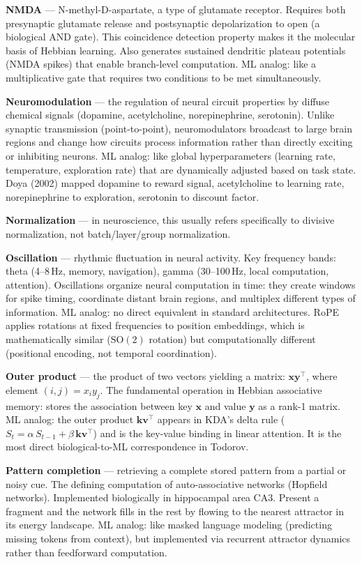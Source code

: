 \documentclass[11pt,a4paper]{article}
\begin{document}
\textbf{NMDA} --- N-methyl-D-aspartate, a type of glutamate receptor. Requires both presynaptic glutamate release and postsynaptic depolarization to open (a biological AND gate). This coincidence detection property makes it the molecular basis of Hebbian learning. Also generates sustained dendritic plateau potentials (NMDA spikes) that enable branch-level computation. ML analog: like a multiplicative gate that requires two conditions to be met simultaneously.

\textbf{Neuromodulation} --- the regulation of neural circuit properties by diffuse chemical signals (dopamine, acetylcholine, norepinephrine, serotonin). Unlike synaptic transmission (point-to-point), neuromodulators broadcast to large brain regions and change how circuits process information rather than directly exciting or inhibiting neurons. ML analog: like global hyperparameters (learning rate, temperature, exploration rate) that are dynamically adjusted based on task state. Doya (2002) mapped dopamine to reward signal, acetylcholine to learning rate, norepinephrine to exploration, serotonin to discount factor.

\textbf{Normalization} --- in neuroscience, this usually refers specifically to divisive normalization, not batch/layer/group normalization.

\textbf{Oscillation} --- rhythmic fluctuation in neural activity. Key frequency bands: theta (4--8\,Hz, memory, navigation), gamma (30--100\,Hz, local computation, attention). Oscillations organize neural computation in time: they create windows for spike timing, coordinate distant brain regions, and multiplex different types of information. ML analog: no direct equivalent in standard architectures. RoPE applies rotations at fixed frequencies to position embeddings, which is mathematically similar ($\mathrm{SO}(2)$ rotation) but computationally different (positional encoding, not temporal coordination).

\textbf{Outer product} --- the product of two vectors yielding a matrix: $\mathbf{x}\mathbf{y}^\top$, where element $(i,j) = x_i y_j$. The fundamental operation in Hebbian associative memory: stores the association between key $\mathbf{x}$ and value $\mathbf{y}$ as a rank-1 matrix. ML analog: the outer product $\mathbf{k}\mathbf{v}^\top$ appears in KDA's delta rule ($S_t = \alpha \, S_{t-1} + \beta \, \mathbf{k}\mathbf{v}^\top$) and is the key-value binding in linear attention. It is the most direct biological-to-ML correspondence in Todorov.

\textbf{Pattern completion} --- retrieving a complete stored pattern from a partial or noisy cue. The defining computation of auto-associative networks (Hopfield networks). Implemented biologically in hippocampal area CA3. Present a fragment and the network fills in the rest by flowing to the nearest attractor in its energy landscape. ML analog: like masked language modeling (predicting missing tokens from context), but implemented via recurrent attractor dynamics rather than feedforward computation.
\end{document}
